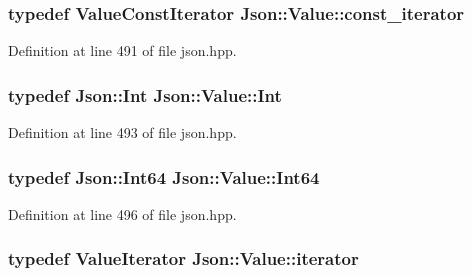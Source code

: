 \hypertarget{class_json_1_1_value_af92282ca92b58b320debd486afb7696a}{
\subsubsection[{const\-\_\-iterator}]{\setlength{\rightskip}{0pt plus 5cm}typedef {\bf Value\-Const\-Iterator} {\bf Json\-::\-Value\-::const\-\_\-iterator}}}\label{class_json_1_1_value_af92282ca92b58b320debd486afb7696a}


Definition at line 491 of file json.\-hpp.

\hypertarget{class_json_1_1_value_abdf7a7ff73eb130ffcab28504ffdb405}{
\subsubsection[{Int}]{\setlength{\rightskip}{0pt plus 5cm}typedef {\bf Json\-::\-Int} {\bf Json\-::\-Value\-::\-Int}}}\label{class_json_1_1_value_abdf7a7ff73eb130ffcab28504ffdb405}


Definition at line 493 of file json.\-hpp.

\hypertarget{class_json_1_1_value_a1b86af9f85f0f1baa972c3319fa22695}{
\subsubsection[{Int64}]{\setlength{\rightskip}{0pt plus 5cm}typedef {\bf Json\-::\-Int64} {\bf Json\-::\-Value\-::\-Int64}}}\label{class_json_1_1_value_a1b86af9f85f0f1baa972c3319fa22695}


Definition at line 496 of file json.\-hpp.

\hypertarget{class_json_1_1_value_a341cdf2e01f8b3c5b7317aa2f0768c53}{
\subsubsection[{iterator}]{\setlength{\rightskip}{0pt plus 5cm}typedef {\bf Value\-Iterator} {\bf Json\-::\-Value\-::iterator}}}\label{class_json_1_1_value_a341cdf2e01f8b3c5b7317aa2f0768c53}


